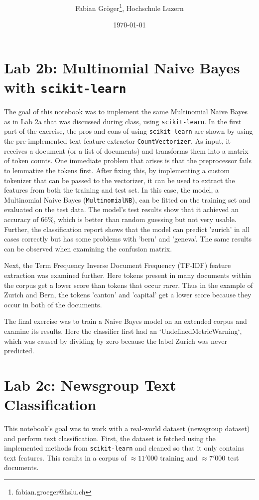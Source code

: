 \documentclass[onecolumn]{article}
\title{\vspace{-3cm}\spacecaps{Lab report: SW04 }\\ \normalsize \spacesc{TSM\_AnTeDe} }
\author{Fabian Gröger\thanks{fabian.groeger@hslu.ch}, Hochschule Luzern}
\date{\today}
\begin{document}
\maketitle

\section{Lab 2b: Multinomial Naive Bayes with \texttt{scikit-learn}}
The goal of this notebook was to implement the same Multinomial Naive Bayes as in Lab 2a that was discussed during class, using \texttt{scikit-learn}. In the first part of the exercise, the pros and cons of using \texttt{scikit-learn} are shown by using the pre-implemented text feature extractor \texttt{CountVectorizer}. As input, it receives a document (or a list of documents) and transforms them into a matrix of token counts. One immediate problem that arises is that the preprocessor fails to lemmatize the tokens first. After fixing this, by implementing a custom tokenizer that can be passed to the vectorizer, it can be used to extract the features from both the training and test set. In this case, the model, a Multinomial Naive Bayes (\texttt{MultinomialNB}), can be fitted on the training set and evaluated on the test data. The model's test results show that it achieved an accuracy of 66\%, which is better than random guessing but not very usable. Further, the classification report shows that the model can predict 'zurich' in all cases correctly but has some problems with 'bern' and 'geneva'. The same results can be observed when examining the confusion matrix. 

Next, the Term Frequency Inverse Document Frequency (TF-IDF) feature extraction was examined further. Here tokens present in many documents within the corpus get a lower score than tokens that occur rarer. Thus in the example of Zurich and Bern, the tokens 'canton' and 'capital' get a lower score because they occur in both of the documents.

The final exercise was to train a Naive Bayes model on an extended corpus and examine its results. Here the classifier first had an `UndefinedMetricWarning`, which was caused by dividing by zero because the label Zurich was never predicted.

\section{Lab 2c: Newsgroup Text Classification}
This notebook's goal was to work with a real-world dataset (newsgroup dataset) and perform text classification. First, the dataset is fetched using the implemented methods from \texttt{scikit-learn} and cleaned so that it only contains text features. This results in a corpus of $\approx 11'000$ training and $\approx 7'000$ test documents.
\end{document}
